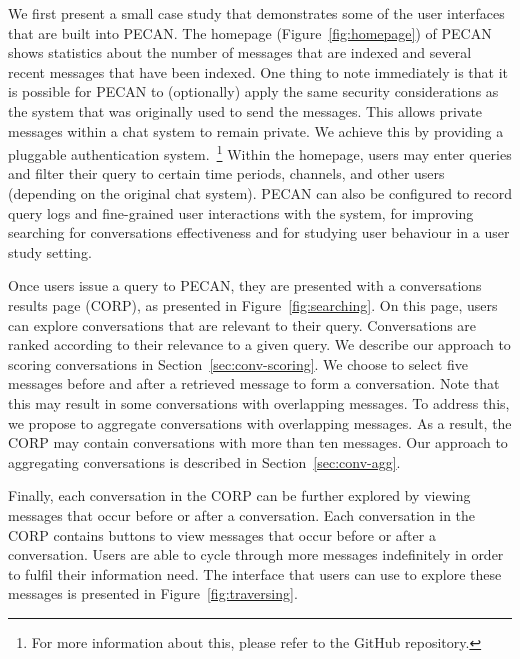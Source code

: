 We first present a small case study that demonstrates some of the user interfaces that are built into PECAN. The homepage (Figure~\ref{fig:homepage}) of PECAN shows statistics about the number of messages that are indexed and several recent messages that have been indexed. One thing to note immediately is that it is possible for PECAN to (optionally) apply the same security considerations as the system that was originally used to send the messages. This allows private messages within a chat system to remain private. We achieve this by providing a pluggable authentication system.~\footnote{For more information about this, please refer to the GitHub repository.} Within the homepage, users may enter queries and filter their query to certain time periods, channels, and other users (depending on the original chat system). PECAN can also be configured to record query logs and fine-grained user interactions with the system, for improving searching for conversations effectiveness and for studying user behaviour in a user study setting.

Once users issue a query to PECAN, they are presented with a conversations results page (CORP), as presented in Figure~\ref{fig:searching}. On this page, users can explore conversations that are relevant to their query. Conversations are ranked according to their relevance to a given query. We describe our approach to scoring conversations in Section~\ref{sec:conv-scoring}. We choose to select five messages before and after a retrieved message to form a conversation. Note that this may result in some conversations with overlapping messages. To address this, we propose to aggregate conversations with overlapping messages. As a result, the CORP may contain conversations with more than ten messages. Our approach to aggregating conversations is described in Section~\ref{sec:conv-agg}.

Finally, each conversation in the CORP can be further explored by viewing messages that occur before or after a conversation. Each conversation in the CORP contains buttons to view messages that occur before or after a conversation. Users are able to cycle through more messages indefinitely in order to fulfil their information need. The interface that users can use to explore these messages is presented in Figure~\ref{fig:traversing}.

